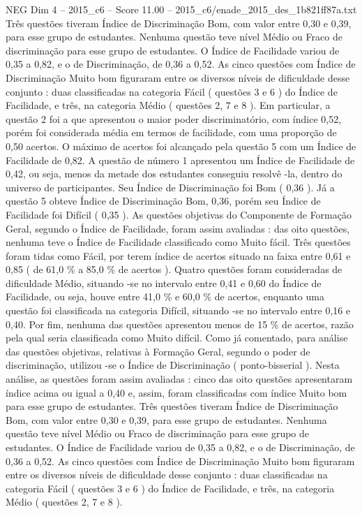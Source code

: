\begin{textsample}{NEG Dim 4 – 2015\_c6 – Score 11.00 – 2015\_c6/enade\_2015\_des\_1b821ff87a.txt}
Três questões tiveram Índice de Discriminação Bom, com valor entre 0,30 e 0,39, para esse grupo de estudantes.
Nenhuma questão teve nível Médio ou Fraco de discriminação para esse grupo de estudantes.
O Índice de Facilidade variou de 0,35 a 0,82, e o de Discriminação, de 0,36 a 0,52.
As cinco questões com Índice de Discriminação Muito bom figuraram entre os diversos níveis de dificuldade desse conjunto : duas classificadas na categoria Fácil ( questões 3 e 6 ) do Índice de Facilidade, e três, na categoria Médio ( questões 2, 7 e 8 ).
Em particular, a questão 2 foi a que apresentou o maior poder discriminatório, com índice 0,52, porém foi considerada média em termos de facilidade, com uma proporção de 0,50 acertos.
O máximo de acertos foi alcançado pela questão 5 com um Índice de Facilidade de 0,82.
A questão de número 1 apresentou um Índice de Facilidade de 0,42, ou seja, menos da metade dos estudantes conseguiu resolvê -la, dentro do universo de participantes.
Seu Índice de Discriminação foi Bom ( 0,36 ).
Já a questão 5 obteve Índice de Discriminação Bom, 0,36, porém seu Índice de Facilidade foi Difícil ( 0,35 ).
As questões objetivas do Componente de Formação Geral, segundo o Índice de Facilidade, foram assim avaliadas : das oito questões, nenhuma teve o Índice de Facilidade classificado como Muito fácil.
Três questões foram tidas como Fácil, por terem índice de acertos situado na faixa entre 0,61 e 0,85 ( de 61,0 \% a 85,0 \% de acertos ).
Quatro questões foram consideradas de dificuldade Médio, situando -se no intervalo entre 0,41 e 0,60 do Índice de Facilidade, ou seja, houve entre 41,0 \% e 60,0 \% de acertos, enquanto uma questão foi classificada na categoria Difícil, situando -se no intervalo entre 0,16 e 0,40.
Por fim, nenhuma das questões apresentou menos de 15 \% de acertos, razão pela qual seria classificada como Muito difícil.
Como já comentado, para análise das questões objetivas, relativas à Formação Geral, segundo o poder de discriminação, utilizou -se o Índice de Discriminação ( ponto-bisserial ).
Nesta análise, as questões foram assim avaliadas : cinco das oito questões apresentaram índice acima ou igual a 0,40 e, assim, foram classificadas com índice Muito bom para esse grupo de estudantes.
Três questões tiveram Índice de Discriminação Bom, com valor entre 0,30 e 0,39, para esse grupo de estudantes.
Nenhuma questão teve nível Médio ou Fraco de discriminação para esse grupo de estudantes.
O Índice de Facilidade variou de 0,35 a 0,82, e o de Discriminação, de 0,36 a 0,52.
As cinco questões com Índice de Discriminação Muito bom figuraram entre os diversos níveis de dificuldade desse conjunto : duas classificadas na categoria Fácil ( questões 3 e 6 ) do Índice de Facilidade, e três, na categoria Médio ( questões 2, 7 e 8 ).

\end{textsample}
